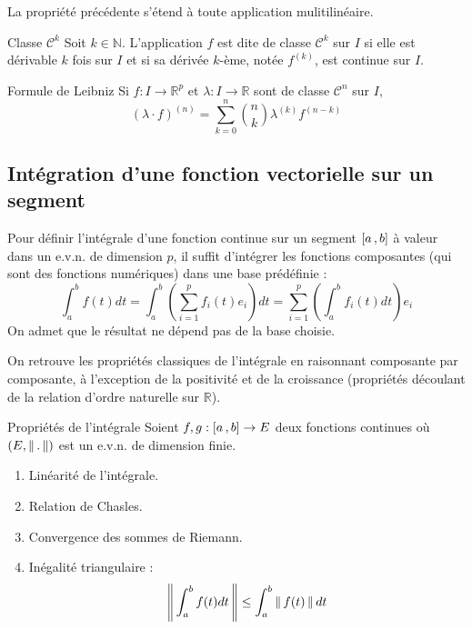     La propriété précédente s’étend à toute application mulitilinéaire.

    \begin{defi}{Classe $\mathcal{C}^k$}{}
        Soit $k \in \mathbb{N}$. L’application $f$ est dite de classe $\mathcal{C}^k$ sur $I$ si elle est dérivable $k$ fois sur $I$ et si sa dérivée $k$-ème, notée $f^{(k)}$, est continue sur $I$.
    \end{defi}

    \begin{prop}{Formule de Leibniz}{}
        Si $f : I \to \mathbb{R}^p$ et $\lambda : I \to \mathbb{R}$ sont de classe $\mathcal{C}^n$ sur $I$, 
        \[ \left(\lambda \cdotp f\right)^{(n)} = \sum_{k=0}^{n} \binom{n}{k} \lambda^{(k)} f^{(n-k)} \]
    \end{prop}

\subsection{Intégration d’une fonction vectorielle sur un segment}

    Pour définir l’intégrale d’une fonction continue sur un segment $\left[ a \, , b \right]$ à valeur dans un e.v.n. de dimension $p$, il suffit d’intégrer les fonctions composantes (qui sont des fonctions numériques) dans une base prédéfinie :
    \[ \int_{a}^{b} f(t)dt = \int_{a}^{b} \left(\sum_{i=1}^{p} f_i(t)e_i \right) dt = \sum_{i=1}^{p} \left(\int_{a}^{b} f_i(t)dt\right) e_i \]
    On admet que le résultat ne dépend pas de la base choisie.

    On retrouve les propriétés classiques de l’intégrale en raisonnant composante par composante, à l’exception de la positivité et de la croissance (propriétés découlant de la relation d’ordre naturelle sur $\mathbb{R}$).

    \begin{prop}{Propriétés de l’intégrale}{}
        Soient $f,g : \left[ a \, , b \right] \to E$ deux fonctions continues où $(E,\left\lVert \,. \, \right\rVert)$ est un e.v.n. de dimension finie.
        \begin{enumerate}
            \item Linéarité de l’intégrale.
            \item Relation de Chasles.
            \item Convergence des sommes de Riemann.
            \item Inégalité triangulaire :
            \[ \left\lVert \,\int_{a}^{b} f(t)dt \, \right\rVert \leq \int_{a}^{b} \left\lVert \,f(t) \, \right\rVert dt \]
        \end{enumerate}
    \end{prop}

